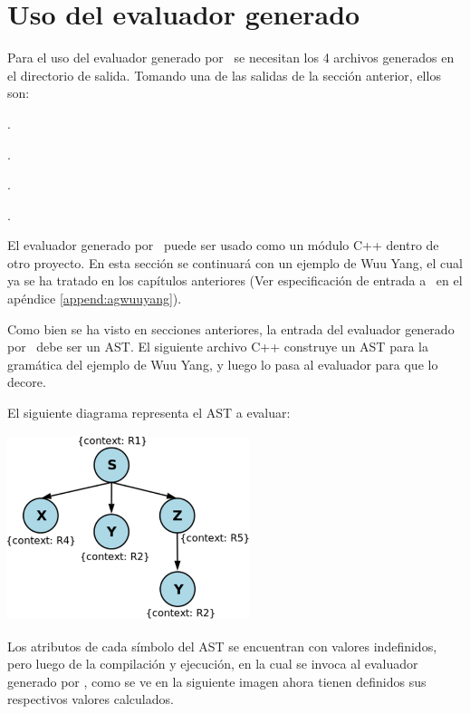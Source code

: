 \section{Uso del evaluador generado}

Para el uso del evaluador generado por \maggen\ se necesitan los 4 archivos generados en el directorio de salida. Tomando una de las salidas de la sección anterior, ellos son:
\begin{items}
\item {}.
\item {}.
\item {}.
\item {}.
\end{items}

El evaluador generado por \maggen\ puede ser usado como un módulo C++ dentro de otro proyecto. En esta sección se continuará con un ejemplo de Wuu Yang, el cual ya se ha tratado en los capítulos anteriores (Ver especificación de entrada a \maggen\ en el apéndice \ref{append:agwuuyang}).

Como bien se ha visto en secciones anteriores, la entrada del evaluador generado por \maggen\ debe ser un AST. El siguiente archivo C++ construye un AST para la gramática del ejemplo de Wuu Yang, y luego lo pasa al evaluador para que lo decore.



El siguiente diagrama representa el AST a evaluar:

\begin{center}
\includegraphics[width=200pt,height=154pt]{ast.png}
\end{center}

Los atributos de cada símbolo del AST se encuentran con valores indefinidos, pero luego de la compilación y ejecución, en la cual se invoca al evaluador generado por \maggen, como se ve en la siguiente imagen ahora tienen definidos sus respectivos valores calculados.

